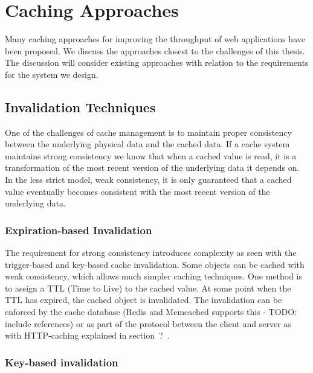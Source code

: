 \chapter{Caching Approaches}
\label{chapter:caching}

Many caching approaches for improving the throughput of web applications have been proposed. We discuss the approaches closest to the challenges of this thesis. The discussion will consider existing approaches with relation to the requirements for the system we design.


\section{Invalidation Techniques}
\label{sec:invalidation_techniques}

One of the challenges of cache management is to maintain proper consistency between the underlying physical data and the cached data. If a cache system maintains strong consistency we know that when a cached value is read, it is a transformation of the most recent version of the underlying data it depends on. In the less strict model, weak consistency, it is only guaranteed that a cached value eventually becomes consistent with the most recent version of the underlying data.



\subsection{Expiration-based Invalidation}
\label{subsec:expiration_based_invalidation}

The requirement for strong consistency introduces complexity as seen with the trigger-based and key-based cache invalidation. Some objects can be cached with weak consistency, which allows much simpler caching techniques. One method is to assign a TTL (Time to Live) to the cached value. At some point when the TTL has expired, the cached object is invalidated. The invalidation can be enforced by the cache database (Redis and Memcached supports this - TODO: include references) or as part of the protocol between the client and server as with HTTP-caching explained in section~?~\cite{paper:web-caching-schemes}.


\subsection{Key-based invalidation}
\label{subsec:key_based_invalidation}


